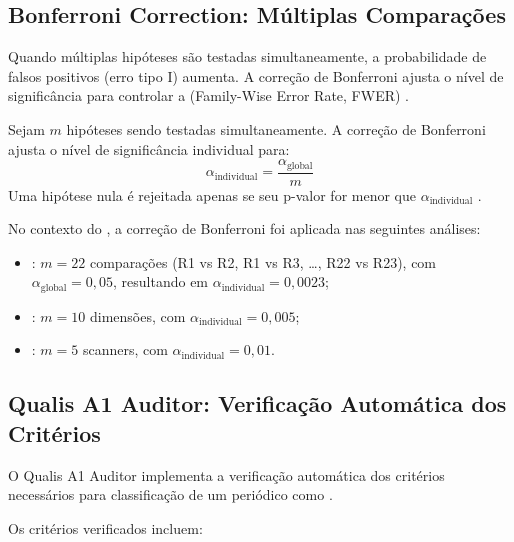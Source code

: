 \subsection{Bonferroni Correction: Múltiplas Comparações}

Quando múltiplas hipóteses são testadas simultaneamente, a probabilidade de
falsos positivos (erro tipo I) aumenta. A correção de Bonferroni ajusta o
nível de significância para controlar a 
(Family-Wise Error Rate, FWER) \cite{bonferroni1936teoria}.

\begin{definicao}
Sejam $m$ hipóteses sendo testadas simultaneamente. A correção de Bonferroni
ajusta o nível de significância individual para:
\begin{equation}
\alpha_{\text{individual}} = \frac{\alpha_{\text{global}}}{m}
\end{equation}
Uma hipótese nula é rejeitada apenas se seu p-valor for menor que
$\alpha_{\text{individual}}$ \cite{bonferroni1936teoria}.
\end{definicao}

No contexto do \opencodeeco{}, a correção de Bonferroni foi aplicada nas
seguintes análises:

\begin{itemize}
\item {}: $m = 22$ comparações
      (R1 vs R2, R1 vs R3, \dots, R22 vs R23), com $\alpha_{\text{global}} = 0,05$,
      resultando em $\alpha_{\text{individual}} = 0,0023$;
\item {}: $m = 10$ dimensões, com
      $\alpha_{\text{individual}} = 0,005$;
\item {}: $m = 5$ scanners, com
      $\alpha_{\text{individual}} = 0,01$.
\end{itemize}

\subsection{Qualis A1 Auditor: Verificação Automática dos Critérios}

O Qualis A1 Auditor implementa a verificação automática dos critérios
necessários para classificação de um periódico como \qualisA{}
\cite{laranjeira2026opencode, laranjeira2026gartner}.

Os critérios verificados incluem:

